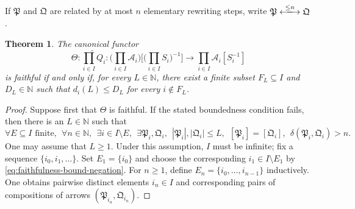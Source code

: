 \documentclass[10pt,a4paper]{amsart}
\theoremstyle{plain}
\newtheorem{theorem}{Theorem}[section]
\theoremstyle{definition}
\theoremstyle{remark}
\begin{document}
If $\mathfrak{P}$ and $\mathfrak Q$ are related by at most $n$ elementary rewriting steps, write $\mathfrak{P}\xlongleftrightarrow{\leq n} \mathfrak{Q}$.

\begin{theorem}\label{thm:product-canonical-faithfulness}
  The canonical functor
  \[
    \Theta:\widetilde{\prod_{i\in I}Q_i}:
    \bigg(\prod_{i\in I}\mathcal A_i\bigg)
    \bigg[\bigg(\prod_{i\in I}S_i\bigg)^{-1}\bigg]
    \longrightarrow
    \prod_{i\in I}\mathcal A_i[S_i^{-1}]
  \]
  is faithful if and only if, for every $L\in\mathbb N$, there exist a finite subset $F_L\subseteq I$ and $D_L\in\mathbb N$ such that $d_i(L)\leq D_L$ for every $i\notin F_L$.
\end{theorem}

\begin{proof}
  Suppose first that $\Theta$ is faithful.
  If the stated boundedness condition fails, then there is an $L\in\mathbb N$ such that
  \begin{equation}\label{eq:faithfulness-bound-negation}
    \forall E\subseteq I\text{ finite},\ \
    \forall n\in\mathbb N,\ \
    \exists i\in I\setminus E,\ \
    \exists\mathfrak P_i,\mathfrak Q_i,\ \
    |\mathfrak P_i|,|\mathfrak Q_i|\leq L,\ \
    [\mathfrak P_i]=[\mathfrak Q_i],\ \
    \delta(\mathfrak P_i,\mathfrak Q_i)>n.
  \end{equation}
  One may assume that $L\geq1$.
  Under this assumption, $I$ must be infinite; fix a sequence $\{i_0, i_1, \ldots\}$.
  Set $E_1 = \{i_0\}$ and choose the corresponding $i_1 \in I \setminus E_1$ by \eqref{eq:faithfulness-bound-negation}.
  For $n \geq 1$, define $E_n=\{i_0,\ldots,i_{n-1}\}$ inductively.
  One obtains pairwise distinct elements $i_n\in I$ and corresponding pairs of compositions of arrows $(\mathfrak P_{i_n},\mathfrak Q_{i_n})$.


\end{proof}
\end{document}
